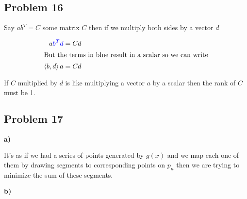 \subsection{Problem 16}

\answer

Say $ab^T = C$ some matrix $C$ then if we multiply both sides by a vector $d$

\begin{align*}
	a\textcolor{blue}{b^Td} = Cd	\\
\intertext{But the terms in blue result in a scalar so we can write}
	\left\langle b, d \right\rangle a = Cd
\end{align*}

If $C$ multiplied by $d$ is like multiplying a vector $a$ by a scalar then the rank of $C$ must be 1. 

\subsection{Problem 17}

\textbf{a)}

\answer

It's as if we had a series of points generated by $g(x)$ and we map each one of them by drawing segments to corresponding points on $p_n$ then we are trying to minimize the sum of these segments.

\textbf{b)}

\answer

















